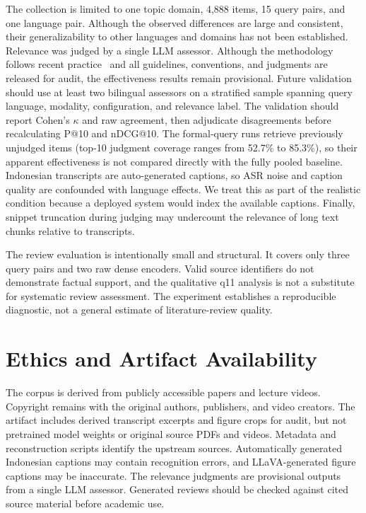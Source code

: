 \documentclass[conference]{IEEEtran}
\begin{document}
The collection is limited to one topic domain, 4{,}888 items, 15 query
pairs, and one language pair. Although the observed differences are large
and consistent, their generalizability to other languages and domains has
not been established. Relevance was judged by a single LLM assessor.
Although the methodology follows recent
practice~\cite{thomas2024,umbrela} and all guidelines, conventions, and
judgments are released for audit, the effectiveness results remain
provisional. Future validation should use at least two bilingual assessors
on a stratified sample spanning query language, modality, configuration,
and relevance label. The validation should report Cohen's $\kappa$ and raw
agreement, then adjudicate disagreements before recalculating P@10 and
nDCG@10. The formal-query runs retrieve previously unjudged items (top-10 judgment
coverage ranges from 52.7\% to 85.3\%), so their apparent effectiveness is
not compared directly with the fully pooled baseline. Indonesian
transcripts are auto-generated captions, so ASR noise and caption quality are confounded
with language effects. We treat this as part of the realistic condition
because a deployed system would index the available captions. Finally,
snippet truncation during judging may undercount the relevance of long text chunks
relative to transcripts.

The review evaluation is intentionally small and structural. It covers only
three query pairs and two raw dense encoders. Valid source identifiers do not
demonstrate factual support, and the qualitative q11 analysis is not a
substitute for systematic review assessment. The experiment establishes a
reproducible diagnostic, not a general estimate of literature-review quality.

\section{Ethics and Artifact Availability}

The corpus is derived from publicly accessible papers and lecture videos.
Copyright remains with the original authors, publishers, and video creators.
The artifact includes derived transcript excerpts and figure crops for audit,
but not pretrained model weights or original source PDFs and videos. Metadata
and reconstruction scripts identify the upstream sources.
Automatically generated Indonesian captions may contain recognition errors,
and LLaVA-generated figure captions may be inaccurate. The relevance
judgments are provisional outputs from a single LLM assessor. Generated
reviews should be checked against cited source material before academic use.
\end{document}

